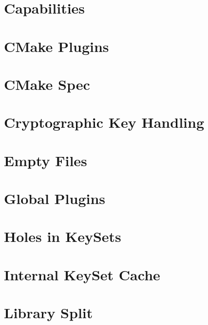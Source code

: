 \documentclass[twoside]{book}
\newcommand{\+}{\discretionary{\mbox{\scriptsize$\hookleftarrow$}}{}{}}
\begin{document}
\chapter{Capabilities}
\label{doc_decisions_capabilities_md}
\hypertarget{doc_decisions_capabilities_md}{}

\chapter{C\+Make Plugins}
\label{doc_decisions_cmake_plugins_md}
\hypertarget{doc_decisions_cmake_plugins_md}{}

\chapter{C\+Make Spec}
\label{doc_decisions_cmake_spec_md}
\hypertarget{doc_decisions_cmake_spec_md}{}

\chapter{Cryptographic Key Handling}
\label{doc_decisions_cryptograhic_key_handling_md}
\hypertarget{doc_decisions_cryptograhic_key_handling_md}{}

\chapter{Empty Files}
\label{doc_decisions_empty_files_md}
\hypertarget{doc_decisions_empty_files_md}{}

\chapter{Global Plugins}
\label{doc_decisions_global_plugins_md}
\hypertarget{doc_decisions_global_plugins_md}{}

\chapter{Holes in Key\+Sets}
\label{doc_decisions_holes_md}
\hypertarget{doc_decisions_holes_md}{}

\chapter{Internal Key\+Set Cache}
\label{doc_decisions_internal_cache_md}
\hypertarget{doc_decisions_internal_cache_md}{}

\chapter{Library Split}
\label{doc_decisions_library_split_md}
\hypertarget{doc_decisions_library_split_md}{}

\end{document}
